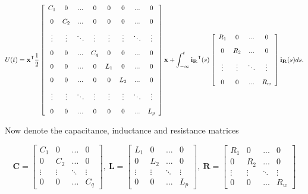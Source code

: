 \begin{equation}
	U(t) = \mathbf{x}^{\mathsf{T}}\dfrac{1}{2}\left[\begin{array}{cccccccc} C_1 & 0 & ... & 0 & 0 & 0 & ... & 0 \\[3mm]  0 & C_2 & ... & 0 & 0 & 0 & ... & 0 \\[3mm] \vdots & \vdots & \ddots & \vdots & \vdots & \vdots & \ddots & \vdots \\[3mm] 0 & 0 & ... & C_q & 0 & 0 & ... & 0 \\[3mm] 0 & 0 & ... & 0 & L_1 & 0 & ... & 0 \\[3mm] 0 & 0 & ... & 0 & 0 & L_2 & ... & 0 \\[3mm] \vdots & \vdots & \ddots & \vdots & \vdots & \vdots & \ddots & \vdots \\[3mm] 0 & 0 & ... & 0 & 0 & 0 & ... & L_p \end{array}\right]\mathbf{x} + \int_{-\infty}^{t} \mathbf{i_R}^{\mathsf{T}}(s) \left[\begin{array}{cccc} R_1 & 0 & ... & 0 \\[3mm] 0 & R_2 & ... & 0 \\[3mm] \vdots & \vdots & \ddots & \vdots \\[3mm] 0 & 0 & ... & R_w \end{array}\right] \mathbf{i_R}(s)ds .
\end{equation}

	Now denote the capacitance, inductance and resistance matrices

\begin{equation}
	\mathbf{C} = \left[\begin{array}{ccccc} C_1 & 0 & ... & 0 \\[3mm]  0 & C_2 & ... & 0 \\[3mm] \vdots & \vdots & \ddots & \vdots \\[3mm] 0 & 0 & ... & C_q \end{array}\right],\
	\mathbf{L} = \left[\begin{array}{ccccc} L_1 & 0 & ... & 0 \\[3mm]  0 & L_2 & ... & 0 \\[3mm] \vdots & \vdots & \ddots & \vdots \\[3mm] 0 & 0 & ... & L_p \end{array}\right],\
	\mathbf{R} = \left[\begin{array}{ccccc} R_1 & 0 & ... & 0 \\[3mm]  0 & R_2 & ... & 0 \\[3mm] \vdots & \vdots & \ddots & \vdots \\[3mm] 0 & 0 & ... & R_w \end{array}\right]
\end{equation}

